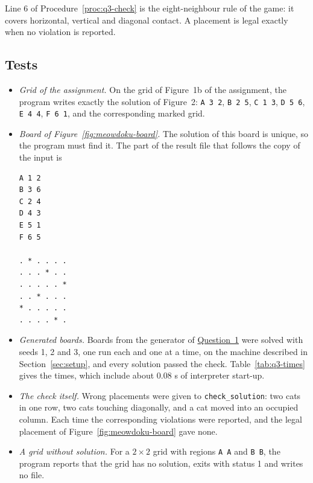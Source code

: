 Line 6 of Procedure~\ref{proc:q3-check} is the eight-neighbour rule of the game: it covers horizontal, vertical and diagonal contact. A placement is legal exactly when no violation is reported.

\subsection{Tests}

\begin{itemize}
\item \emph{Grid of the assignment.} On the grid of Figure~1b of the assignment, the program writes exactly the solution of Figure~2: \texttt{A 3 2}, \texttt{B 2 5}, \texttt{C 1 3}, \texttt{D 5 6}, \texttt{E 4 4}, \texttt{F 6 1}, and the corresponding marked grid.
\item \emph{Board of Figure~\ref{fig:meowdoku-board}.} The solution of this board is unique, so the program must find it. The part of the result file that follows the copy of the input is
\begin{verbatim}
A 1 2
B 3 6
C 2 4
D 4 3
E 5 1
F 6 5

. * . . . .
. . . * . .
. . . . . *
. . * . . .
* . . . . .
. . . . * .
\end{verbatim}
\item \emph{Generated boards.} Boards from the generator of \hyperref[sec:q1]{Question~1} were solved with seeds 1, 2 and 3, one run each and one at a time, on the machine described in Section~\ref{sec:setup}, and every solution passed the check. Table~\ref{tab:q3-times} gives the times, which include about 0.08 s of interpreter start-up.
\item \emph{The check itself.} Wrong placements were given to \texttt{check\_solution}: two cats in one row, two cats touching diagonally, and a cat moved into an occupied column. Each time the corresponding violations were reported, and the legal placement of Figure~\ref{fig:meowdoku-board} gave none.
\item \emph{A grid without solution.} For a $2\times2$ grid with regions \texttt{A A} and \texttt{B B}, the program reports that the grid has no solution, exits with status 1 and writes no file.
\end{itemize}

